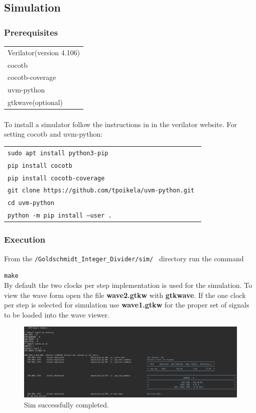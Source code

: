 \documentclass[letterpaper]{article}
\begin{document}
	\subsection{Simulation}
	
	\subsubsection{Prerequisites}
	
	
	\begin{tabular}{l}
	    Verilator(version 4.106) \\
	    cocotb \\
	    cocotb-coverage \\
	    uvm-python \\
	    gtkwave(optional)\\
    \end{tabular}
	
	\paragraph{}To install a simulator follow the instructions in in the verilator website.
	For setting cocotb and uvm-python: 
	
	\begin{tabular}{l}
	    {\tt sudo apt install python3-pip } \\
	    {\tt pip install cocotb } \\
	    {\tt pip install cocotb-coverage } \\
	    {\tt git clone https://github.com/tpoikela/uvm-python.git } \\
	    {\tt cd uvm-python } \\
	    {\tt python -m pip install --user . } \\
    \end{tabular}
	
	
	\subsubsection{Execution}
	
	From the {\tt /Goldschmidt\_Integer\_Divider/sim/ } directory run the command
	
	{\tt make}\\
	
	By default the two clocks per step implementation is used for the simulation. To view the wave form open the file \textbf{wave2.gtkw} with \textbf{gtkwave}. If the one clock per step is selected for simulation use \textbf{wave1.gtkw} for the proper set of signals to be loaded into the wave viewer.
	
	\begin{figure}[h]
		\centering
		\includegraphics[width=0.99\linewidth]{../figures/Screenshot_sim}
		\caption[sim]{Sim successfully completed.}
		\label{fig:screenshotsim}
	\end{figure}
	
	
\end{document}
